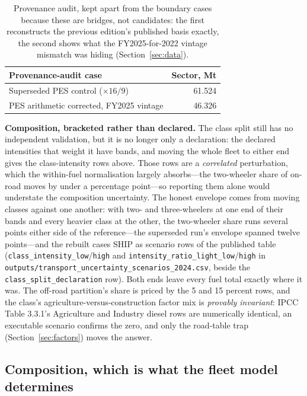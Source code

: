 \begin{table}[htbp]
\centering
\footnotesize
\begin{tabular}{@{}lr@{}}
\toprule
\textbf{Provenance-audit case} & \textbf{Sector, Mt \COe{}} \\
\midrule
Superseded PES control ($\times16/9$)    & 61.524 \\
PES arithmetic corrected, FY2025 vintage & 46.326 \\
\bottomrule
\end{tabular}
\caption{Provenance audit, kept apart from the boundary cases because these are bridges,
not candidates: the first reconstructs the previous edition's published basis exactly, the
second shows what the FY2025-for-2022 vintage mismatch was hiding
(Section~\ref{sec:data}).}
\label{tab:provenance}
\end{table}

\textbf{Composition, bracketed rather than declared.} The class split still has no
independent validation, but it is no longer only a declaration: the declared intensities
that weight it have bands, and moving the whole fleet to either end gives the
class-intensity rows above. Those rows are a \emph{correlated} perturbation, which the
within-fuel normalisation largely absorbs---the two-wheeler share of on-road \COtwo{}
moves by under a percentage point---so reporting them alone would
understate the composition uncertainty. The honest envelope comes from moving classes
against one another: with two- and three-wheelers at one end of their bands and every
heavier class at the other, the two-wheeler share runs several points either
side of the reference---the superseded run's envelope spanned twelve points---and the
rebuilt cases SHIP as scenario rows of the published table
(\texttt{class\_intensity\_low}/\texttt{high} and
\texttt{intensity\_ratio\_light\_low}/\texttt{high} in
\texttt{outputs/transport\_uncertainty\_scenarios\_2024.csv}, beside the
\texttt{class\_split\_declaration} row). Both ends leave every
fuel total exactly where it was. The off-road partition's share is priced by the 5 and
15 percent rows, and the class's agriculture-versus-construction factor mix is
\emph{provably invariant}: IPCC Table 3.3.1's Agriculture and Industry diesel rows are
numerically identical, an executable scenario confirms the zero, and only the road-table
trap (Section~\ref{sec:factors}) moves the answer.

\subsection{Composition, which is what the fleet model determines}

